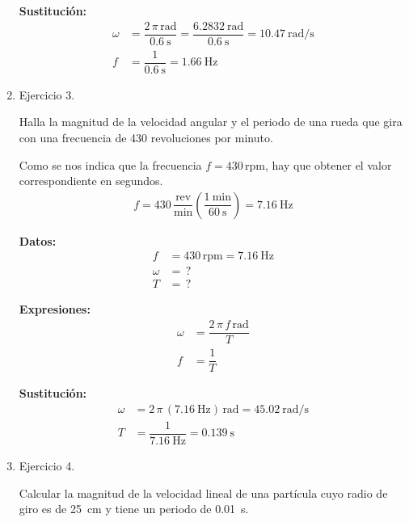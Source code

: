 \documentclass[12pt]{article}
\begin{document}
\begin{enumerate}
\textbf{Sustitución:}
\begin{align*}
\omega &= \dfrac{2 \, \pi \, \unit{\radian}}{\SI{0.6}{\second}} = \dfrac{\SI{6.2832}{\radian}}{\SI{0.6}{\second}} = \SI[per-mode=fraction]{10.47}{\radian\per\second} \\[0.5em]
f &= \dfrac{1}{\SI{0.6}{\second}} = \SI{1.66}{\hertz}
\end{align*}
\item Ejercicio 3.

Halla la magnitud de la velocidad angular y el periodo de una rueda que gira con una frecuencia de \num{430} revoluciones por minuto.

Como se nos indica que la frecuencia $f = 430 \, \text{rpm}$, hay que obtener el valor correspondiente en segundos.
\begin{align*}
f = 430 \, \dfrac{\text{rev}}{\unit{\minute}} \left( \dfrac{\SI{1}{\minute}}{\SI{60}{\second}} \right) = \SI{7.16}{\hertz}
\end{align*}

\vspace*{0.5cm}
\begin{minipage}[t]{0.4\linewidth}
\textbf{Datos:}
\begin{align*}
f &= \num{430} \, \text{rpm} = \SI{7.16}{\hertz} \\
\omega &= \, ? \\
T &= \, ?
\end{align*}
\end{minipage}
\begin{minipage}[t]{0.4\linewidth}
\textbf{Expresiones:}
\begin{align*}
\omega &= \dfrac{2 \, \pi \, f \, \unit{\radian}}{T} \\[0.5em]
f &= \dfrac{1}{T}
\end{align*}
\end{minipage}

\textbf{Sustitución:}
\begin{align*}
\omega &= 2 \, \pi \, \left( \SI{7.16}{\hertz} \right) \, \unit{\radian}= \SI[per-mode=fraction]{45.02}{\radian\per\second} \\[0.5em]
T &= \dfrac{1}{\SI{7.16}{\hertz}} = \SI{0.139}{\second}
\end{align*}
\item Ejercicio 4.

Calcular la magnitud de la velocidad lineal de una partícula cuyo radio de giro es de \SI{25}{\centi\meter} y tiene un periodo de \SI{0.01}{\second}.


\end{enumerate}
\end{document}
